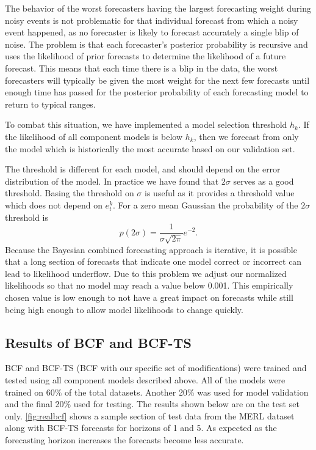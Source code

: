 The behavior of the worst forecasters having the largest forecasting weight during noisy events is not problematic for that individual forecast from which a noisy event happened, as no forecaster is likely to forecast accurately a single blip of noise.  The problem is that each forecaster's posterior probability is recursive and uses the likelihood of prior forecasts to determine the likelihood of a future forecast.  This means that each time there is a blip in the data, the worst forecasters will typically be given the most weight for the next few forecasts until enough time has passed for the posterior probability of each forecasting model to return to typical ranges.

To combat this situation, we have implemented a model selection threshold $h_{k}$.  If the likelihood of all component models is below $h_{k}$, then we forecast from only the model which is historically the most accurate based on our validation set.  

The threshold is different for each model, and should depend on the error distribution of the model.  In practice we have found that $2\sigma$ serves as a good threshold.  Basing the threshold on $\sigma$ is useful as it provides a threshold value which does not depend on $e^{k}_{t}$.  For a zero mean Gaussian the probability of the $2\sigma$ threshold is
\begin{equation}
p(2\sigma) = \frac{1}{\sigma\sqrt{2\pi}}e^{-2}.
\end{equation}
Because the Bayesian combined forecasting approach is iterative, it is possible that a long section of forecasts that indicate one model correct or incorrect can lead to likelihood underflow.  Due to this problem we adjust our normalized likelihoods so that no model may reach a value below 0.001.  This empirically chosen value is low enough to not have a great impact on forecasts while still being high enough to allow model likelihoods to change quickly.

\subsection{Results of BCF and BCF-TS}

BCF and BCF-TS (BCF with our specific set of modifications) were trained and tested using all component models described above.  All of the models were trained on 60\% of the total datasets.  Another 20\% was used for model validation and the final 20\% used for testing.  The results shown below are on the test set only.  \ref{fig:realbcf} shows a sample section of test data from the MERL dataset along with BCF-TS forecasts for horizons of 1 and 5.  As expected as the forecasting horizon increases the forecasts become less accurate.

